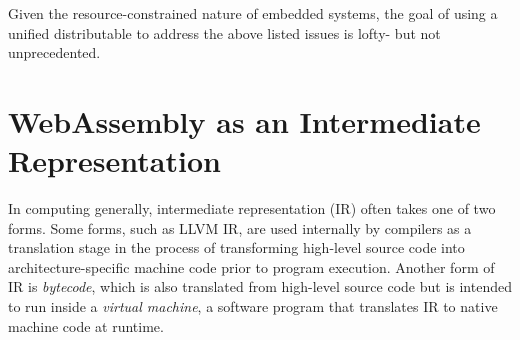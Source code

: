 Given the resource-constrained nature of embedded systems, the goal of using a unified distributable to address the above listed issues is lofty- but not unprecedented.




\section { WebAssembly as an Intermediate Representation }



In computing generally, intermediate representation (IR) often takes one of two forms. Some forms, such as LLVM IR\cite{1281665}, are used internally by compilers as a translation stage in the process of transforming high-level source code into architecture-specific machine code prior to program execution. Another form of IR is \textit{bytecode}, which is also translated from high-level source code but is intended to run inside a \textit{virtual machine}\cite{lindholm2013java}, a software program that translates IR to native machine code at runtime.


